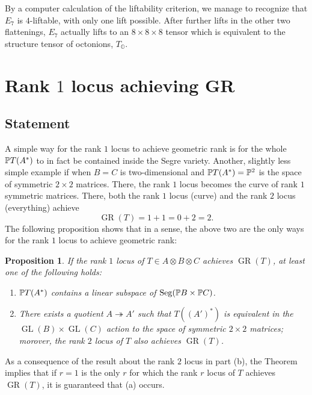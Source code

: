 \documentclass[a4paper,10pt]{article}
\def\oct{\mathbb O}
\let\surjto\twoheadrightarrow
\DeclareMathOperator{\Seg}{Seg}
\DeclareMathOperator{\GR}{GR}
\DeclareMathOperator{\GL}{GL}
\newtheorem{prop}[theorem]{Proposition}
\theoremstyle{definition}
\theoremstyle{remark}
\begin{document}
By a computer calculation of the liftability criterion, we manage to recognize that $E_7$ is $4$-liftable, with only one lift possible. After further lifts in the other two flattenings, $E_7$ actually lifts to an $8\times 8\times 8$ tensor which is equivalent to the structure tensor of octonions, $T_{\oct}$.




\section{Rank $1$ locus achieving GR}
\label{sec:rank-one-degeneracies}

\subsection{Statement}

A simple way for the rank $1$ locus to achieve geometric rank is for the whole $\pe T(A^*)$ to in fact be contained inside the Segre variety. Another, slightly less simple example if when $B=C$ is two-dimensional and $\pe T(A^*)=\pe^2$ is the space of symmetric $2\times2$ matrices. There, the rank $1$ locus becomes the curve of rank $1$ symmetric matrices. There, both the rank $1$ locus (curve) and the rank $2$ locus (everything) achieve
\[
    \GR(T) = 1+1 = 0+2 = 2.
\]
The following proposition shows that in a sense, the above two are the only ways for the rank $1$ locus to achieve geometric rank:

\begin{prop}
    \label{prp:pawel}
    If the rank $1$ locus of $T\in A\otimes B\otimes C$ achieves $\GR(T)$, at least one of the following holds:
    \begin{enumerate}[label={\textup{(\alph*)}}]
        \item $\pe T(A^*)$ contains a linear subspace of $\Seg(\pe B\times\pe C)$.
        \item There exists a quotient $A\surjto A'$ such that $T((A')^*)$ is equivalent in the $\GL(B)\times\GL(C)$ action to the space of symmetric $2\times 2$ matrices; morover, the rank $2$ locus of $T$ also achieves $\GR(T)$.
    \end{enumerate}
\end{prop}
As a consequence of the result about the rank $2$ locus in part (b), the Theorem implies that if $r=1$ is the only $r$ for which the rank $r$ locus of $T$ achieves $\GR(T)$, it is guaranteed that (a) occurs.
\end{document}
